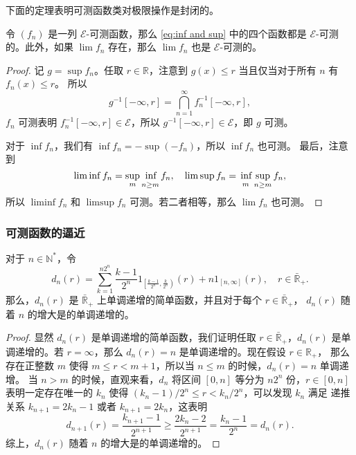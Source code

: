\documentclass[fontset=none]{Notes}
\begin{document}
下面的定理表明可测函数类对极限操作是封闭的。
\begin{theorem}\label{thm:lim of measurable function is measurable}
  令 $(f_n)$ 是一列 $\mathcal{E}$-可测函数，那么 \eqref{eq:inf and sup} 中的四个函数都是
  $\mathcal{E}$-可测的。此外，如果 $\lim f_n$ 存在，那么 $\lim f_n$ 也是 $\mathcal{E}$-可测的。
\end{theorem}
\begin{proof}
  记 $g=\sup f_n$。任取 $r\in \mathbb{R}$，注意到 $g(x)\leq r$ 当且仅当对于所有 $n$ 有 $f_n(x)\leq r$。
  所以
  \[
    g^{-1}[-\infty,r]=\bigcap_{n=1}^\infty f_n^{-1}[-\infty,r],
  \]
  $f_n$ 可测表明 $f_n^{-1}[-\infty,r]\in \mathcal{E}$，所以 $g^{-1}[-\infty,r]\in \mathcal{E}$，即
  $g$ 可测。

  对于 $\inf f_n$，我们有 $\inf f_n=-\sup (-f_n)$，所以 $\inf f_n$ 也可测。
  最后，注意到
  \[
    \liminf f_n=\sup\limits_m \mathop{\vphantom{\sup}\inf}_{n\geq m} f_n,\quad
    \limsup f_n=\mathop{\vphantom{\sup}\inf}_{m}\sup_{n\geq m} f_n,
  \] 
  所以 $\liminf f_n$ 和 $\limsup f_n$ 可测。若二者相等，那么 $\lim f_n$ 也可测。
\end{proof}

\subsubsection{可测函数的逼近}

\begin{lemma}
  对于 $n\in \mathbb{N}^*$，令
  \[
    d_n(r)=\sum_{k=1}^{n2^n}\frac{k-1}{2^n}1_{\left[\frac{k-1}{2^n},\frac{k}{2^n}\right)}(r)
    +n1_{[n,\infty]}(r),\quad r\in \bar{\mathbb{R}}_+.
  \]
  那么，$d_n(r)$ 是 $\bar{\mathbb{R}}_+$ 上单调递增的简单函数，并且对于每个 $r\in\bar{\mathbb{R}}_+$，
  $d_n(r)$ 随着 $n$ 的增大是的单调递增的。
\end{lemma}
\begin{proof}
  显然 $d_n(r)$ 是单调递增的简单函数，我们证明任取 $r\in \bar{\mathbb{R}}_+$，$d_n(r)$
  是单调递增的。若 $r=\infty$，那么 $d_n(r)=n$ 是单调递增的。现在假设 $r\in \mathbb{R}_+$，
  那么存在正整数 $m$ 使得 $m\leq r<m+1$，所以当 $n\leq m$ 的时候，$d_n(r)=n$ 单调递增。
  当 $n>m$ 的时候，直观来看，$d_n$ 将区间 $[0,n]$ 等分为 $n2^{n}$ 份，$r\in [0,n]$
  表明一定存在唯一的 $k_n$ 使得 $(k_n-1)/2^n\leq r <k_n/2^n$，可以发现 $k_{n}$ 满足 
  递推关系 $k_{n+1}=2k_n-1$ 或者 $k_{n+1}=2k_n$，这表明
  \[
    d_{n+1}(r)= \frac{k_{n+1}-1}{2^{n+1}}\geq\frac{2k_n-2}{2^{n+1}}=\frac{k_n-1}{2^n}=d_n(r).
  \]
  综上，$d_n(r)$ 随着 $n$ 的增大是的单调递增的。
\end{proof}
\end{document}
